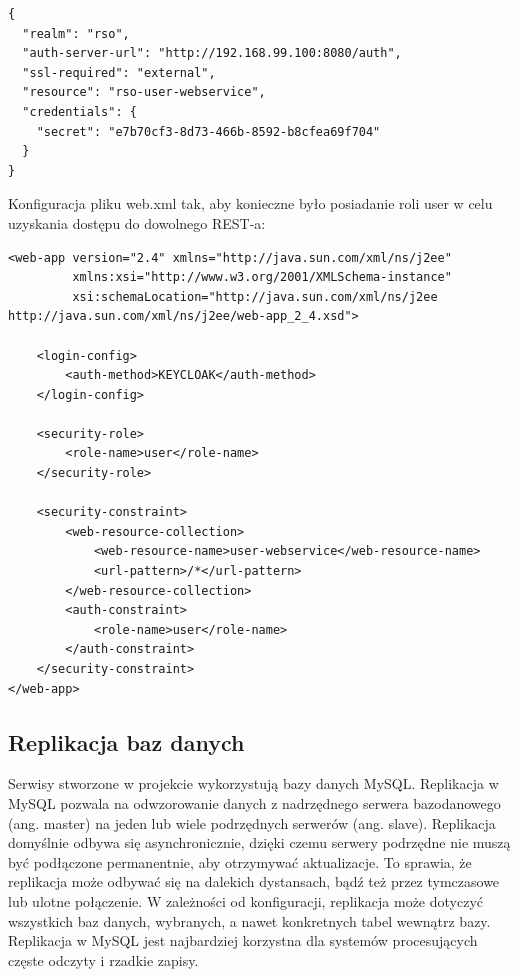 \documentclass[11pt,a4paper,twoside]{article}
\begin{document}
\begin{lstlisting}
{
  "realm": "rso",
  "auth-server-url": "http://192.168.99.100:8080/auth",
  "ssl-required": "external",
  "resource": "rso-user-webservice",
  "credentials": {
    "secret": "e7b70cf3-8d73-466b-8592-b8cfea69f704"
  }
}
\end{lstlisting}
\vspace{-20pt}
\clearpage
Konfiguracja pliku web.xml tak, aby konieczne było posiadanie roli user w celu uzyskania dostępu do dowolnego REST-a:

\begin{lstlisting}
<web-app version="2.4" xmlns="http://java.sun.com/xml/ns/j2ee"
         xmlns:xsi="http://www.w3.org/2001/XMLSchema-instance"
         xsi:schemaLocation="http://java.sun.com/xml/ns/j2ee http://java.sun.com/xml/ns/j2ee/web-app_2_4.xsd">

    <login-config>
        <auth-method>KEYCLOAK</auth-method>
    </login-config>

    <security-role>
        <role-name>user</role-name>
    </security-role>

    <security-constraint>
        <web-resource-collection>
            <web-resource-name>user-webservice</web-resource-name>
            <url-pattern>/*</url-pattern>
        </web-resource-collection>
        <auth-constraint>
            <role-name>user</role-name>
        </auth-constraint>
    </security-constraint>
</web-app>
\end{lstlisting}
\subsection{Replikacja baz danych}
Serwisy stworzone w projekcie wykorzystują bazy danych MySQL. Replikacja w MySQL pozwala na odwzorowanie danych z nadrzędnego serwera bazodanowego (ang. master) na jeden lub wiele podrzędnych serwerów (ang. slave). Replikacja domyślnie odbywa się asynchronicznie, dzięki czemu serwery podrzędne nie muszą być podłączone permanentnie, aby otrzymywać aktualizacje. To sprawia, że replikacja może odbywać się na dalekich dystansach, bądź też przez tymczasowe lub ulotne połączenie. W zależności od konfiguracji, replikacja może dotyczyć wszystkich baz danych, wybranych, a nawet konkretnych tabel wewnątrz bazy. Replikacja w MySQL jest najbardziej korzystna dla systemów procesujących częste odczyty i rzadkie zapisy.
\end{document}
